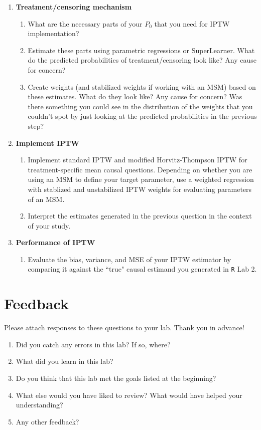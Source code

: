 \documentclass[answers]{exam}
\begin{document}
\begin{enumerate}
\item \textbf{Treatment/censoring mechanism}
\begin{enumerate}
\item What are the necessary parts of your $P_0$ that you need for IPTW implementation?
\item Estimate these parts using parametric regressions or SuperLearner. What do the predicted probabilities of treatment/censoring look like? Any cause for concern?
\item Create weights (and stabilized weights if working with an MSM) based on these estimates. What do they look like? Any cause for concern? Was there something you could see in the distribution of the weights that you couldn't spot by just looking at the predicted probabilities in the previous step?
\end{enumerate}
\item \textbf{Implement IPTW}
\begin{enumerate}
\item Implement standard IPTW and modified Horvitz-Thompson IPTW for treatment-specific mean causal questions. Depending on whether you are using an MSM to define your target parameter, use a weighted regression with stablized and unstabilized IPTW weights for evaluating parameters of an MSM.
\item Interpret the estimates generated in the previous question in the context of your study.
\end{enumerate}
\item \textbf{Performance of IPTW}
\begin{enumerate}
\item Evaluate the bias, variance, and MSE of your IPTW estimator by comparing it against the ``true" causal estimand you generated in \texttt{R} Lab 2.
\end{enumerate}
\end{enumerate}

\pagebreak

\section{Feedback}

Please attach responses to these questions to your lab. Thank you in advance!

\begin{enumerate}
\item Did you catch any errors in this lab? If so, where?
\item What did you learn in this lab?
\item Do you think that this lab met the goals listed at the beginning? 
\item What else would you have liked to review? What would have helped your understanding?
\item Any other feedback?
\end{enumerate}
\end{document}

